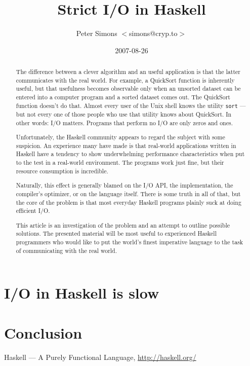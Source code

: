 \documentclass[abstracton,a4paper,twocolumn,9pt]{scrartcl}
\def\LASTCHANGED{2007-08-26}    %
\newcommand{\tool}[1]{\texttt{#1}}
\begin{document}
\title{Strict I/O in Haskell}
\author{Peter Simons $<$simons@cryp.to$>$}
\date{\LASTCHANGED}
\maketitle

\begin{abstract}
  The difference between a clever algorithm and an useful application is
  that the latter communicates with the real world. For example, a
  QuickSort function is inherently useful, but that usefulness becomes
  observable only when an unsorted dataset can be entered into a
  computer program and a sorted dataset comes out. The QuickSort
  function doesn't do that. Almost every user of the Unix shell knows
  the utility \tool{sort} --- but not every one of those people who use
  that utility knows about QuickSort. In other words: I/O matters.
  Programs that perform no I/O are only zeros and ones.

  Unfortunately, the Haskell community appears to regard the subject
  with some suspicion. An experience many have made is that real-world
  applications written in Haskell have a tendency to show underwhelming
  performance characteristics when put to the test in a real-world
  environment. The programs work just fine, but their resource
  consumption is incredible.

  Naturally, this effect is generally blamed on the I/O API, the
  implementation, the compiler's optimizer, or on the language itself.
  There is some truth in all of that, but the core of the problem is
  that most everyday Haskell programs plainly suck at doing efficient
  I/O.

  This article is an investigation of the problem and an attempt to
  outline possible solutions. The presented material will be most useful
  to experienced Haskell programmers who would like to put the world's
  finest imperative language to the task of communicating with the real
  world.
\end{abstract}

\section{I/O in Haskell is slow} %

  




\section{Conclusion} %

\begin{thebibliography}{9}
      Haskell --- A Purely Functional Language,
      \url{http://haskell.org/}

\end{thebibliography}
\end{document}

